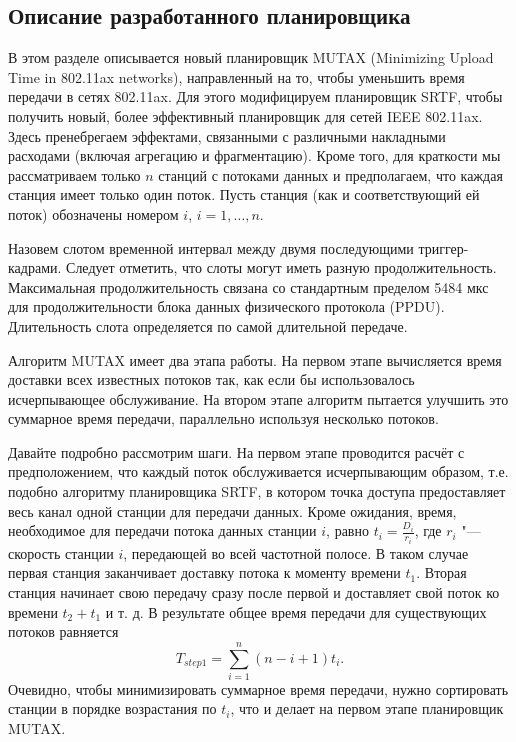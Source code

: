 \subsection{Описание разработанного планировщика}

В этом разделе описывается новый планировщик MUTAX (Minimizing Upload Time in 802.11ax networks), направленный на то, чтобы уменьшить время передачи в сетях 802.11ax. Для этого модифицируем планировщик SRTF, чтобы получить новый, более эффективный планировщик для сетей IEEE 802.11ax.
Здесь пренебрегаем эффектами, связанными с различными накладными расходами (включая агрегацию и фрагментацию). 
Кроме того, для краткости мы рассматриваем только $n$ станций с потоками данных и предполагаем, что каждая станция имеет только один поток. 
Пусть станция (как и соответствующий ей поток) обозначены номером $i$, $i = 1,\dots,n$. 

Назовем слотом временной интервал между двумя последующими триггер-кадрами.
Следует отметить, что слоты могут иметь разную продолжительность. 
Максимальная продолжительность связана со стандартным пределом 5484 мкс для продолжительности блока данных физического протокола (PPDU). 
Длительность слота определяется по самой длительной передаче.

Алгоритм MUTAX имеет два этапа работы. 
На первом этапе вычисляется время доставки всех известных потоков так, как если бы использовалось исчерпывающее обслуживание. 
На втором этапе алгоритм пытается улучшить это суммарное время передачи, параллельно используя несколько потоков.

Давайте подробно рассмотрим шаги. На первом этапе проводится расчёт с предположением, что каждый поток обслуживается исчерпывающим образом, т.е. подобно алгоритму планировщика SRTF, в котором точка доступа предоставляет весь канал одной станции для передачи данных. Кроме ожидания, время, необходимое для передачи потока данных станции $i$, равно $t_i = \frac{D_i}{r_{i}}$, где $r_i$ "--- скорость станции $i$, передающей во всей частотной полосе. В таком случае первая станция заканчивает доставку потока к моменту времени $t_1$. Вторая станция начинает свою передачу сразу после первой и доставляет свой поток ко времени $t_2 + t_1$ и т. д. В результате общее время передачи для существующих потоков равняется
\[ T_{step1} = \sum_{i = 1}^{n} \left(n - i + 1\right) t_i. \]
Очевидно, чтобы минимизировать суммарное время передачи, нужно сортировать станции в порядке возрастания по $t_i$, что и делает на первом этапе планировщик MUTAX.

